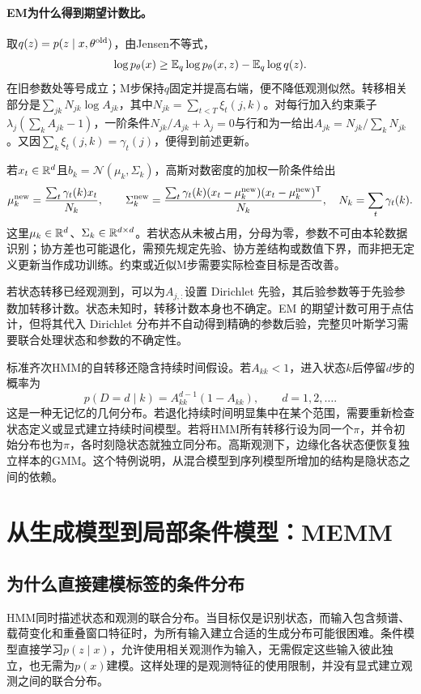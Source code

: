 \paragraph{EM为什么得到期望计数比。}
取$q(z)=p(z\mid x,\theta^{\rm old})$，由Jensen不等式，
\begin{equation}
 \log p_\theta(x)\geq\mathbb{E}_q\log p_\theta(x,z)-\mathbb{E}_q\log q(z).
\end{equation}
在旧参数处等号成立；M步保持$q$固定并提高右端，便不降低观测似然。转移相关部分是$\sum_{jk}N_{jk}\log A_{jk}$，其中$N_{jk}=\sum_{t<T}\xi_t(j,k)$。对每行加入约束乘子$\lambda_j(\sum_kA_{jk}-1)$，一阶条件$N_{jk}/A_{jk}+\lambda_j=0$与行和为一给出$A_{jk}=N_{jk}/\sum_kN_{jk}$。又因$\sum_k\xi_t(j,k)=\gamma_t(j)$，便得到前述更新。

若$x_t\in\mathbb{R}^d$且$b_k=\mathcal N(\mu_k,\Sigma_k)$，高斯对数密度的加权一阶条件给出
\begin{equation}
 \mu_k^{\rm new}=\frac{\sum_t\gamma_t(k)x_t}{N_k},\qquad
 \Sigma_k^{\rm new}=\frac{\sum_t\gamma_t(k)(x_t-\mu_k^{\rm new})(x_t-\mu_k^{\rm new})^{\mathsf T}}{N_k},
 \quad N_k=\sum_t\gamma_t(k).
\end{equation}
这里$\mu_k\in\mathbb{R}^d$、$\Sigma_k\in\mathbb{R}^{d\times d}$。若状态从未被占用，分母为零，参数不可由本轮数据识别；协方差也可能退化，需预先规定先验、协方差结构或数值下界，而非把无定义更新当作成功训练。约束或近似M步需要实际检查目标是否改善。

若状态转移已经观测到，可以为$A_{j,:}$设置 Dirichlet 先验，其后验参数等于先验参数加转移计数。状态未知时，转移计数本身也不确定。EM 的期望计数可用于点估计，但将其代入 Dirichlet 分布并不自动得到精确的参数后验，完整贝叶斯学习需要联合处理状态和参数的不确定性。

标准齐次HMM的自转移还隐含持续时间假设。若$A_{kk}<1$，进入状态$k$后停留$d$步的概率为
\begin{equation}
 p(D=d\mid k)=A_{kk}^{d-1}(1-A_{kk}),\qquad d=1,2,\ldots.
\end{equation}
这是一种无记忆的几何分布。若退化持续时间明显集中在某个范围，需要重新检查状态定义或显式建立持续时间模型。若将HMM所有转移行设为同一个$\pi$，并令初始分布也为$\pi$，各时刻隐状态就独立同分布。高斯观测下，边缘化各状态便恢复独立样本的GMM。这个特例说明，从混合模型到序列模型所增加的结构是隐状态之间的依赖。

\section{从生成模型到局部条件模型：MEMM}
\subsection{为什么直接建模标签的条件分布}
HMM同时描述状态和观测的联合分布。当目标仅是识别状态，而输入包含频谱、载荷变化和重叠窗口特征时，为所有输入建立合适的生成分布可能很困难。条件模型直接学习$p(z\mid x)$，允许使用相关观测作为输入，无需假定这些输入彼此独立，也无需为$p(x)$建模。这样处理的是观测特征的使用限制，并没有显式建立观测之间的联合分布。

